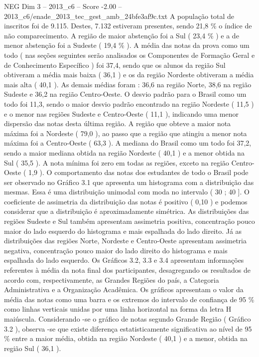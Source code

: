 \begin{textsample}{NEG Dim 3 – 2013\_c6 – Score -2.00 – 2013\_c6/enade\_2013\_tec\_gest\_amb\_24bfe3af9c.txt}
A população total de inscritos foi de 9.115.
Destes, 7.132 estiveram presentes, sendo 21,8 \% o índice de não comparecimento.
A região de maior abstenção foi a Sul ( 23,4 \% ) e a de menor abstenção foi a Sudeste ( 19,4 \% ).
A média das notas da prova como um todo ( nas seções seguintes serão analisados os Componentes de Formação Geral e de Conhecimento Específico ) foi 37,4, sendo que os alunos da região Sul obtiveram a média mais baixa ( 36,1 ) e os da região Nordeste obtiveram a média mais alta ( 40,1 ).
As demais médias foram : 36,6 na região Norte, 38,6 na região Sudeste e 36,2 na região Centro-Oeste.
O desvio padrão para o Brasil como um todo foi 11,3, sendo o maior desvio padrão encontrado na região Nordeste ( 11,5 ) e o menor nas regiões Sudeste e Centro-Oeste ( 11,1 ), indicando uma menor dispersão das notas desta última região.
A região que obteve a maior nota máxima foi a Nordeste ( 79,0 ), ao passo que a região que atingiu a menor nota máxima foi a Centro-Oeste ( 63,3 ).
A mediana do Brasil como um todo foi 37,2, sendo a maior mediana obtida na região Nordeste ( 40,1 ) e a menor obtida na Sul ( 35,5 ).
A nota mínima foi zero em todas as regiões, exceto na região Centro-Oeste ( 1,9 ).
O comportamento das notas dos estudantes de todo o Brasil pode ser observado no Gráfico 3.1 que apresenta um histograma com a distribuição das mesmas.
Essa é uma distribuição unimodal com moda no intervalo ( 30 ; 40 ].
O coeficiente de assimetria da distribuição das notas é positivo ( 0,10 ) e podemos considerar que a distribuição é aproximadamente simétrica.
As distribuições das regiões Sudeste e Sul também apresentam assimetria positiva, concentração pouco maior do lado esquerdo do histograma e mais espalhada do lado direito.
Já as distribuições das regiões Norte, Nordeste e Centro-Oeste apresentam assimetria negativa, concentração pouco maior do lado direito do histograma e mais espalhada do lado esquerdo.
Os Gráficos 3.2, 3.3 e 3.4 apresentam informações referentes à média da nota final dos participantes, desagregando os resultados de acordo com, respectivamente, as Grandes Regiões do país, a Categoria Administrativa e a Organização Acadêmica.
Os gráficos apresentam o valor da média das notas como uma barra e os extremos do intervalo de confiança de 95 \% como linhas verticais unidas por uma linha horizontal na forma da letra H maiúscula.
Considerando -se o gráfico de notas segundo Grande Região ( Gráfico 3.2 ), observa -se que existe diferença estatisticamente significativa ao nível de 95 \% entre a maior média, obtida na região Nordeste ( 40,1 ) e a menor, obtida na região Sul ( 36,1 ).

\end{textsample}
